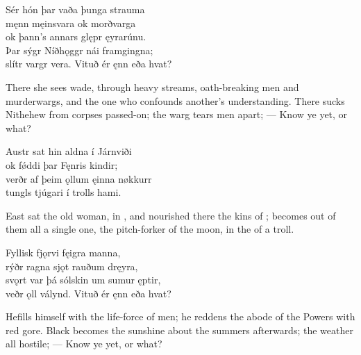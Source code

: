 \bva Sér hón þar vaða \hld þunga strauma \\%
męnn męinsvara \hld ok morðvarga \\%
ok þann’s annars glępr \hld ęyrarúnu. \\%
Þar sýgr Níðhǫggr \hld nái framgingna; \\%
slítr vargr vera. \hld Vituð ér ęnn eða hvat?\eva

\bvb There she sees wade, through heavy streams, oath-breaking men and murderwargs, and the one who confounds another’s understanding\footnotemark[1]. There sucks Nithehew from corpses passed-on; the warg tears men apart; — Know ye yet, or what?\evb
{}

\bva Austr sat hin aldna \hld í Járnviði \\%
ok fǿddi þar \hld Fęnris kindir; \\%
verðr af þeim ǫllum \hld ęinna nøkkurr \\%
tungls tjúgari \hld í trolls hami.\eva

\bvb East sat the old woman, in , and nourished there the kins of ; becomes out of them all a single one, the pitch-forker of the moon, in the  of a troll.\footnotemark[1]\evb
{}

\bva Fyllisk fjǫrvi \hld fęigra manna, \\%
rýðr ragna sjǫt \hld rauðum dręyra, \\%
svǫrt var þá sólskin \hld um sumur ęptir, \\%
veðr ǫll válynd. \hld Vituð ér ęnn eða hvat?\eva

\bvb He\footnotemark[1] fills himself with the life-force of  men; he reddens the abode of the Powers with red gore. Black becomes the sunshine about the summers afterwards\footnotemark[2]; the weather all hostile; — Know ye yet, or what?\evb
{}

